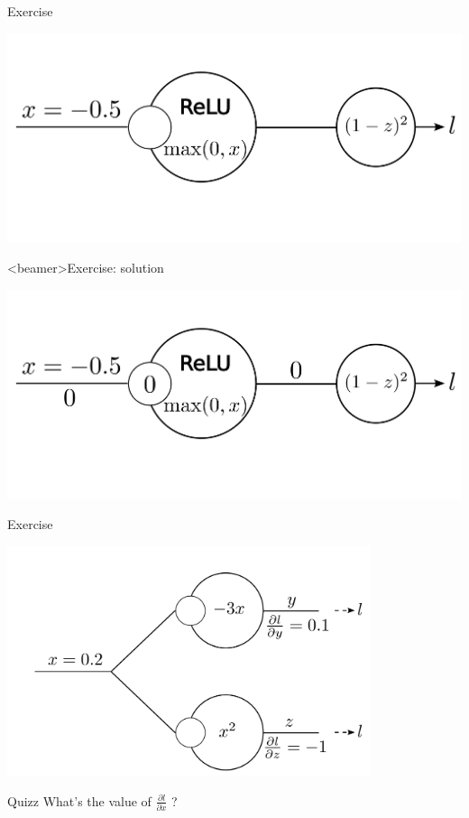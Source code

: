 \documentclass[xcolor=pdftex,dvipsnames,table,mathserif]{beamer}
\begin{document}
\begin{frame}{Exercise}

  \includegraphics[width=\textwidth]{bp_relu_exo2.png}

\end{frame}

\begin{frame}<beamer>{Exercise: solution}

  \includegraphics[width=\textwidth]{bp_relu_exo2_sol.png}

\end{frame}


\begin{frame}{Exercise}

  \includegraphics[width=0.8\textwidth]{bp_split.png}

  \begin{block}{Quizz}
    What's the value of  $\frac{\partial l}{\partial x}$ ?
  \end{block}

\end{frame}
\end{document}
